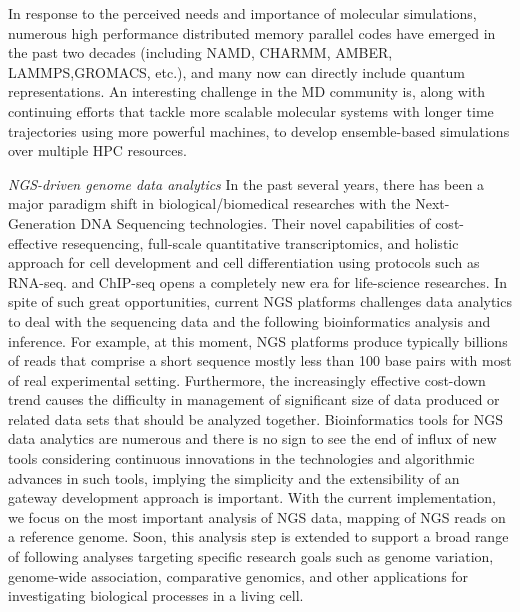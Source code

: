 \documentclass{sig-alternate}
\begin{document}

In response to the perceived needs and importance of molecular
simulations, numerous high performance distributed memory parallel codes
have emerged in the past two decades (including NAMD, CHARMM, AMBER,
LAMMPS,GROMACS, etc.), and many now can
directly include quantum representations.  An interesting challenge in the MD community is, along with continuing efforts that tackle more scalable molecular systems with longer time trajectories using more powerful machines, to develop ensemble-based simulations over multiple HPC resources.  

\textit{NGS-driven genome data analytics}
In the past several years, there has been a major paradigm shift in biological/biomedical researches with the Next-Generation DNA Sequencing technologies\cite{mardis2008-tig,metzker2010,mardis2008-arghg}.  Their novel capabilities of cost-effective resequencing, full-scale quantitative transcriptomics, and holistic approach for cell development and cell differentiation using protocols such as RNA-seq. and ChIP-seq opens a completely new era for life-science researches\cite{sorek2010,mortazavi2008}.  In spite of such great opportunities, current NGS platforms challenges data analytics to deal with the sequencing data and the following bioinformatics analysis and inference.  For example, at this moment, NGS platforms produce typically billions of reads that comprise a short sequence mostly less than 100 base pairs with most of real experimental setting\cite{alex2009,trapnell2009}.  Furthermore, the increasingly effective cost-down trend causes the difficulty in management of significant size of data produced or related data sets that should be analyzed together.  Bioinformatics tools for NGS data analytics are numerous and there is no sign to see the end of influx of new tools considering continuous innovations in the technologies and algorithmic advances in such tools, implying the simplicity and the extensibility of an gateway development approach is important.  With the current implementation, we focus on the  most important analysis of NGS data, mapping of NGS reads on a reference genome.  Soon, this analysis step is extended to support a broad range of following analyses targeting specific research goals such as genome variation, genome-wide association, comparative genomics, and other applications for investigating biological processes in a living cell.     
\end{document}
